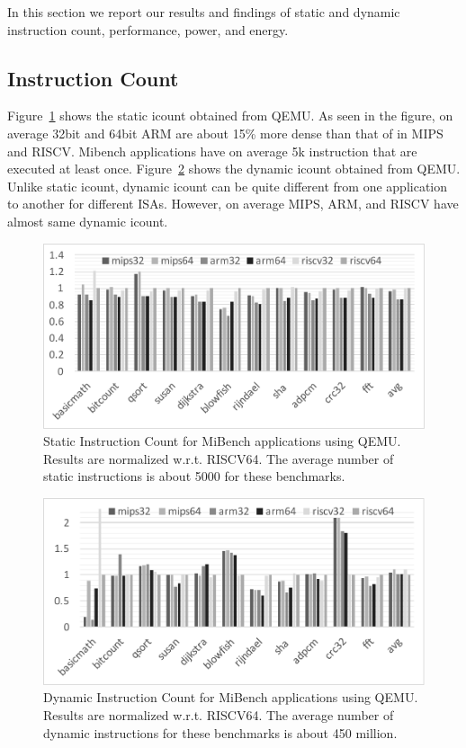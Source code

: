 In this section we report our results and findings of static and dynamic instruction count, performance, power, and energy. 

\subsection{Instruction Count}
Figure~\ref{fig:static} shows the static icount obtained from QEMU. As seen in the figure, on average 32bit and 64bit ARM are about 15\% more dense than that of in MIPS and RISCV. Mibench applications have on average 5k instruction that are executed at least once. Figure~\ref{fig:dynamic} shows the dynamic icount obtained from QEMU. Unlike static icount, dynamic icount can be quite different from one application to another for different ISAs. However, on average MIPS, ARM, and RISCV have almost same dynamic icount. 

\begin{figure}[htb]
	\centering
	\includegraphics[width=1.8\columnwidth]{figures/static.pdf}
	\caption{Static Instruction Count for MiBench applications using QEMU. Results are normalized w.r.t. RISCV64. The average number of static instructions is about 5000 for these benchmarks.}
	\label{fig:static}
\end{figure} 

\begin{figure}[htb]
	\centering
	\includegraphics[width=1.8\columnwidth]{figures/dynamic.pdf}
	\caption{Dynamic Instruction Count for MiBench applications using QEMU. Results are normalized w.r.t. RISCV64. The average number of dynamic instructions for these benchmarks is about 450 million.}
	\label{fig:dynamic}
\end{figure} 

